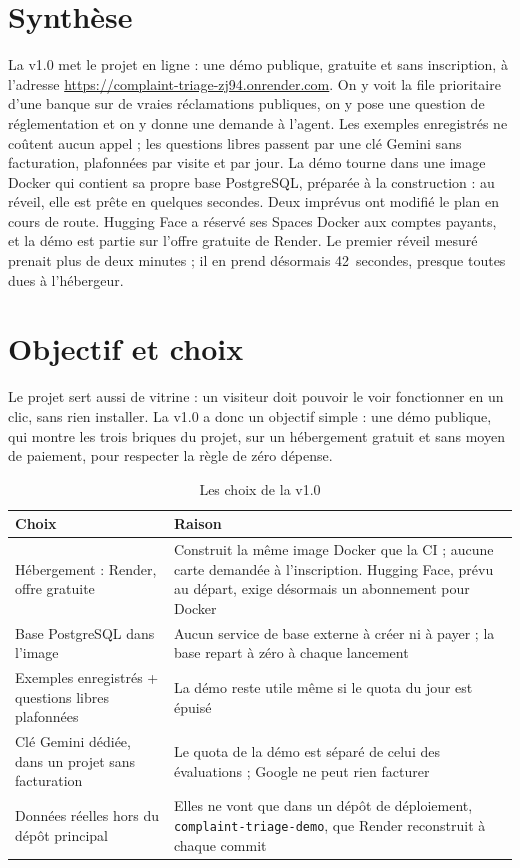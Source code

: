 \documentclass[11pt,a4paper]{article}
\begin{document}

\section*{Synthèse}

La v1.0 met le projet en ligne : une démo publique, gratuite et sans inscription, à l'adresse \url{https://complaint-triage-zj94.onrender.com}. On y voit la file prioritaire d'une banque sur de vraies réclamations publiques, on y pose une question de réglementation et on y donne une demande à l'agent. Les exemples enregistrés ne coûtent aucun appel ; les questions libres passent par une clé Gemini sans facturation, plafonnées par visite et par jour. La démo tourne dans une image Docker qui contient sa propre base PostgreSQL, préparée à la construction : au réveil, elle est prête en quelques secondes. Deux imprévus ont modifié le plan en cours de route. Hugging Face a réservé ses Spaces Docker aux comptes payants, et la démo est partie sur l'offre gratuite de Render. Le premier réveil mesuré prenait plus de deux minutes ; il en prend désormais 42~secondes, presque toutes dues à l'hébergeur.

\setcounter{tocdepth}{1}
\tableofcontents
\newpage

\section{Objectif et choix}

Le projet sert aussi de vitrine : un visiteur doit pouvoir le voir fonctionner en un clic, sans rien installer. La v1.0 a donc un objectif simple : une démo publique, qui montre les trois briques du projet, sur un hébergement gratuit et sans moyen de paiement, pour respecter la règle de zéro dépense.

\begin{table}[H]
\centering\small
\begin{tabularx}{\linewidth}{@{}l Y@{}}
\toprule
Choix & Raison \\
\midrule
Hébergement : Render, offre gratuite & Construit la même image Docker que la CI ; aucune carte demandée à l'inscription. Hugging Face, prévu au départ, exige désormais un abonnement pour Docker \\
Base PostgreSQL dans l'image & Aucun service de base externe à créer ni à payer ; la base repart à zéro à chaque lancement \\
Exemples enregistrés + questions libres plafonnées & La démo reste utile même si le quota du jour est épuisé \\
Clé Gemini dédiée, dans un projet sans facturation & Le quota de la démo est séparé de celui des évaluations ; Google ne peut rien facturer \\
Données réelles hors du dépôt principal & Elles ne vont que dans un dépôt de déploiement, \texttt{complaint-triage-demo}, que Render reconstruit à chaque commit \\
\bottomrule
\end{tabularx}
\caption{Les choix de la v1.0}
\end{table}
\end{document}
